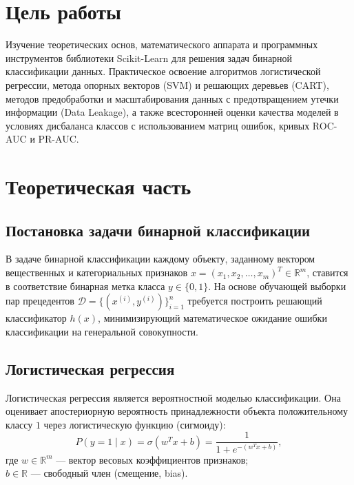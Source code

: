 \documentclass[14pt,a4paper]{extarticle}
\begin{document}
\section{Цель работы}

Изучение теоретических основ, математического аппарата и программных инструментов библиотеки Scikit-Learn для решения задач бинарной классификации данных. Практическое освоение алгоритмов логистической регрессии, метода опорных векторов (SVM) и решающих деревьев (CART), методов предобработки и масштабирования данных с предотвращением утечки информации (Data Leakage), а также всесторонней оценки качества моделей в условиях дисбаланса классов с использованием матриц ошибок, кривых ROC-AUC и PR-AUC.

\section{Теоретическая часть}

\subsection{Постановка задачи бинарной классификации}

В задаче бинарной классификации каждому объекту, заданному вектором вещественных и категориальных признаков $x = (x_1, x_2, \dots, x_m)^T \in \mathbb{R}^m$, ставится в соответствие бинарная метка класса $y \in \{0, 1\}$. На основе обучающей выборки пар прецедентов $\mathcal{D} = \{(x^{(i)}, y^{(i)})\}_{i=1}^n$ требуется построить решающий классификатор $h(x)$, минимизирующий математическое ожидание ошибки классификации на генеральной совокупности.

\subsection{Логистическая регрессия}

Логистическая регрессия является вероятностной моделью классификации. Она оценивает апостериорную вероятность принадлежности объекта положительному классу $1$ через логистическую функцию (сигмоиду):
\begin{equation}
    P(y = 1 \mid x) = \sigma(w^T x + b) = \frac{1}{1 + e^{-(w^T x + b)}},
\end{equation}
где $w \in \mathbb{R}^m$ --- вектор весовых коэффициентов признаков;\\
$b \in \mathbb{R}$ --- свободный член (смещение, bias).
\end{document}
